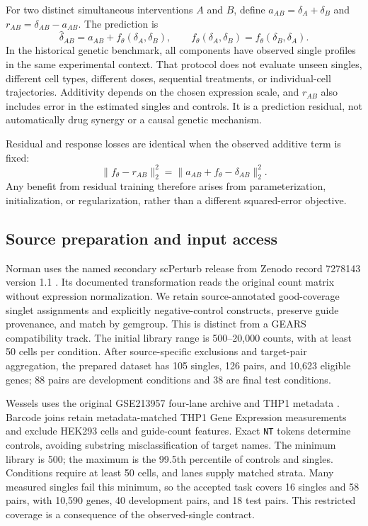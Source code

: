 \documentclass{article}
\begin{document}
For two distinct simultaneous interventions $A$ and $B$, define $a_{AB}=\delta_A+\delta_B$ and $r_{AB}=\delta_{AB}-a_{AB}$. The prediction is
\begin{equation}\widehat\delta_{AB}=a_{AB}+f_\theta(\delta_A,\delta_B),\qquad f_\theta(\delta_A,\delta_B)=f_\theta(\delta_B,\delta_A).\label{eq:model}\end{equation}
In the historical genetic benchmark, all components have observed single profiles in the same experimental context. That protocol does not evaluate unseen singles, different cell types, different doses, sequential treatments, or individual-cell trajectories. Additivity depends on the chosen expression scale, and $r_{AB}$ also includes error in the estimated singles and controls. It is a prediction residual, not automatically drug synergy or a causal genetic mechanism.

Residual and response losses are identical when the observed additive term is fixed:
\begin{equation}\|f_\theta-r_{AB}\|_2^2=\|a_{AB}+f_\theta-\delta_{AB}\|_2^2.\end{equation}
Any benefit from residual training therefore arises from parameterization, initialization, or regularization, rather than a different squared-error objective.

\subsection{Source preparation and input access}
Norman uses the named secondary scPerturb release from Zenodo record 7278143 version 1.1 \citep{scperturb2024state}. Its documented transformation reads the original count matrix without expression normalization. We retain source-annotated good-coverage singlet assignments and explicitly negative-control constructs, preserve guide provenance, and match by gemgroup. This is distinct from a GEARS compatibility track. The initial library range is 500--20,000 counts, with at least 50 cells per condition. After source-specific exclusions and target-pair aggregation, the prepared dataset has 105 singles, 126 pairs, and 10,623 eligible genes; 88 pairs are development conditions and 38 are final test conditions.

Wessels uses the original GSE213957 four-lane archive and THP1 metadata \citep{wessels2023}. Barcode joins retain metadata-matched THP1 Gene Expression measurements and exclude HEK293 cells and guide-count features. Exact \texttt{NT} tokens determine controls, avoiding substring misclassification of target names. The minimum library is 500; the maximum is the 99.5th percentile of controls and singles. Conditions require at least 50 cells, and lanes supply matched strata. Many measured singles fail this minimum, so the accepted task covers 16 singles and 58 pairs, with 10,590 genes, 40 development pairs, and 18 test pairs. This restricted coverage is a consequence of the observed-single contract.
\end{document}

